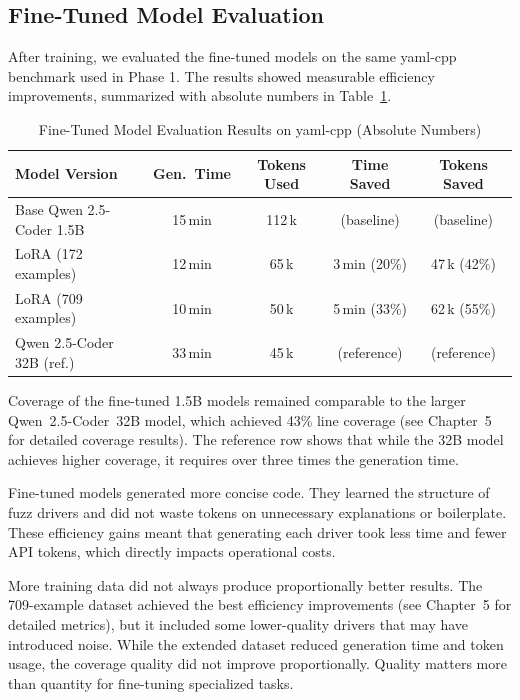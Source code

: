 \subsection{Fine-Tuned Model Evaluation}

After training, we evaluated the fine-tuned models on the same yaml-cpp benchmark used in Phase 1. The results showed measurable efficiency improvements, summarized with absolute numbers in Table~\ref{tab:finetune_eval_impl}.

\begin{table}[htbp]
\centering
\caption{Fine-Tuned Model Evaluation Results on yaml-cpp (Absolute Numbers)}
\label{tab:finetune_eval_impl}
\small
\begin{tabular}{lcccc}
\toprule
Model Version & Gen.\ Time & Tokens Used & Time Saved & Tokens Saved \\
\midrule
Base Qwen 2.5-Coder 1.5B & 15\,min & 112\,k & (baseline) & (baseline) \\
LoRA (172 examples) & 12\,min & 65\,k & 3\,min (20\%) & 47\,k (42\%) \\
LoRA (709 examples) & 10\,min & 50\,k & 5\,min (33\%) & 62\,k (55\%) \\
\midrule
Qwen 2.5-Coder 32B (ref.) & 33\,min & 45\,k & (reference) & (reference) \\
\bottomrule
\end{tabular}
\end{table}

Coverage of the fine-tuned 1.5B models remained comparable to the larger Qwen~2.5-Coder~32B model, which achieved 43\% line coverage (see Chapter~5 for detailed coverage results). The reference row shows that while the 32B model achieves higher coverage, it requires over three times the generation time.

Fine-tuned models generated more concise code. They learned the structure of fuzz drivers and did not waste tokens on unnecessary explanations or boilerplate. These efficiency gains meant that generating each driver took less time and fewer API tokens, which directly impacts operational costs.

More training data did not always produce proportionally better results. The 709-example dataset achieved the best efficiency improvements (see Chapter~5 for detailed metrics), but it included some lower-quality drivers that may have introduced noise. While the extended dataset reduced generation time and token usage, the coverage quality did not improve proportionally. Quality matters more than quantity for fine-tuning specialized tasks.

